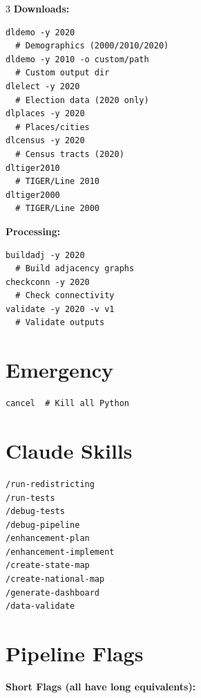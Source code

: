 \documentclass[10pt,landscape]{article}
\begin{document}
\begin{multicols}{3}
\textbf{Downloads:}
\begin{Verbatim}[fontsize=\small,frame=single]
dldemo -y 2020
  # Demographics (2000/2010/2020)
dldemo -y 2010 -o custom/path
  # Custom output dir
dlelect -y 2020
  # Election data (2020 only)
dlplaces -y 2020
  # Places/cities
dlcensus -y 2020
  # Census tracts (2020)
dltiger2010
  # TIGER/Line 2010
dltiger2000
  # TIGER/Line 2000
\end{Verbatim}

\textbf{Processing:}
\begin{Verbatim}[fontsize=\small,frame=single]
buildadj -y 2020
  # Build adjacency graphs
checkconn -y 2020
  # Check connectivity
validate -y 2020 -v v1
  # Validate outputs
\end{Verbatim}

\section*{Emergency}

\begin{Verbatim}[fontsize=\small,frame=single]
cancel  # Kill all Python
\end{Verbatim}

\section*{Claude Skills}

\begin{Verbatim}[fontsize=\small,frame=single]
/run-redistricting
/run-tests
/debug-tests
/debug-pipeline
/enhancement-plan
/enhancement-implement
/create-state-map
/create-national-map
/generate-dashboard
/data-validate
\end{Verbatim}

\columnbreak

\section*{Pipeline Flags}

\textbf{Short Flags (all have long equivalents):}

\vspace{2pt}


\end{multicols}
\end{document}

